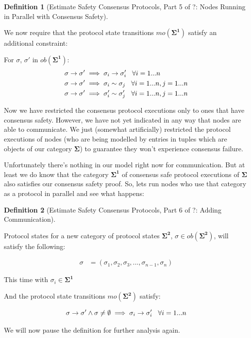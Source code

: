 \documentclass{article}
\theoremstyle{definition}
\newtheorem{defn}{Definition}[section]
\newcommand{\cat}{
	\mathbf
}
\begin{document}
\begin{defn}[Estimate Safety Consensus Protocols, Part 5 of ?: Nodes Running in Parallel with Consensus Safety]
\begin{description}

We now require that the protocol state transitions $mo(\cat{\Sigma^1})$ satisfy an additional constraint:

For $\sigma$, $\sigma'$ in $ob(\cat{\Sigma^1})$:
\begin{align*}
  \sigma \to \sigma' &\implies \sigma_i \to \sigma'_i \hspace{3mm} \forall i=1...n\\
  \sigma \to \sigma' &\implies \sigma_i \sim \sigma_j \hspace{3mm} \forall i=1...n, j=1...n\\
  \sigma \to \sigma' &\implies \sigma'_i \sim \sigma'_j \hspace{3mm} \forall i=1...n, j=1...n
\end{align*}

\end{description}
\end{defn}

Now we have restricted the consensus protocol executions only to ones that have consensus safety. However, we have not yet indicated in any way that nodes are able to communicate. We just (somewhat artificially) restricted the protocol executions of nodes (who are being modelled by entries in tuples which are objects of our category $\cat{\Sigma}$) to guarantee they won't experience consensus failure.

Unfortunately there's nothing in our model right now for communication. But at least we do know that the category $\cat{\Sigma^1}$ of consensus safe protocol executions of $\cat{\Sigma}$ also satisfies our consensus safety proof. So, lets run nodes who use that category as a protocol in parallel and see what happens:


\begin{defn}[Estimate Safety Consensus Protocols, Part 6 of ?: Adding Communication]
\begin{description}


Protocol states for a new category of protocol states $\cat{\Sigma^2}$, $\sigma \in ob(\cat{\Sigma^2})$, will satisfy the following:

\begin{align*}
  \sigma &= (\sigma_1,\sigma_2,\sigma_3,...,\sigma_{n-1},\sigma_n)
\end{align*}

This time with $\sigma_i \in \cat{\Sigma^1}$ 

And the protocol state transitions $mo(\cat{\Sigma^2})$ satisfy:

$$
\sigma \to \sigma' \land \sigma \neq \emptyset \implies \sigma_i \to \sigma'_i \hspace{3mm} \forall i=1...n
$$

We will now pause the definition for further analysis again.

\end{description}
\end{defn}
\end{document}
